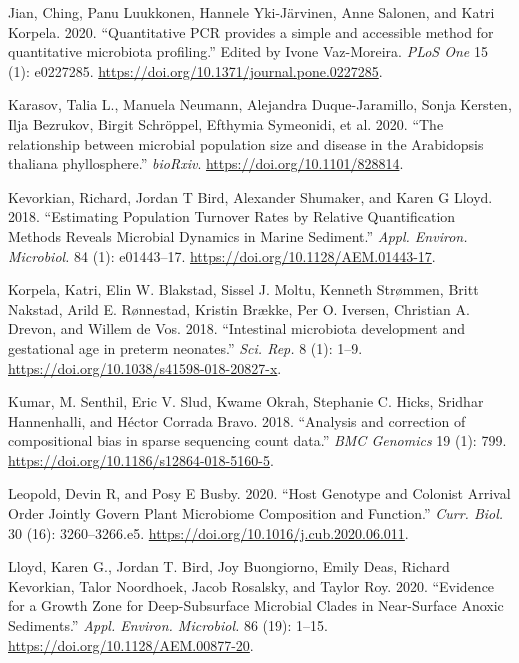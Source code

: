 \documentclass[
]{article}
\newlength{\cslhangindent}
\newlength{\cslentryspacingunit} %
\newenvironment{CSLReferences}[2] %
 {%
  \setlength{\parindent}{0pt}
  \ifodd #1
  \let\oldpar\par
  \def\par{\hangindent=\cslhangindent\oldpar}
  \fi
  \setlength{\parskip}{#2\cslentryspacingunit}
 }%
 {}
\begin{document}
\begin{CSLReferences}{1}{0}
\leavevmode{}%
Jian, Ching, Panu Luukkonen, Hannele Yki-Järvinen, Anne Salonen, and Katri Korpela. 2020. {``{Quantitative PCR provides a simple and accessible method for quantitative microbiota profiling}.''} Edited by Ivone Vaz-Moreira. \emph{PLoS One} 15 (1): e0227285. \url{https://doi.org/10.1371/journal.pone.0227285}.

\leavevmode{}%
Karasov, Talia L., Manuela Neumann, Alejandra Duque-Jaramillo, Sonja Kersten, Ilja Bezrukov, Birgit Schröppel, Efthymia Symeonidi, et al. 2020. {``{The relationship between microbial population size and disease in the Arabidopsis thaliana phyllosphere}.''} \emph{bioRxiv}. \url{https://doi.org/10.1101/828814}.

\leavevmode{}%
Kevorkian, Richard, Jordan T Bird, Alexander Shumaker, and Karen G Lloyd. 2018. {``{Estimating Population Turnover Rates by Relative Quantification Methods Reveals Microbial Dynamics in Marine Sediment}.''} \emph{Appl. Environ. Microbiol.} 84 (1): e01443--17. \url{https://doi.org/10.1128/AEM.01443-17}.

\leavevmode{}%
Korpela, Katri, Elin W. Blakstad, Sissel J. Moltu, Kenneth Strømmen, Britt Nakstad, Arild E. Rønnestad, Kristin Brække, Per O. Iversen, Christian A. Drevon, and Willem de Vos. 2018. {``{Intestinal microbiota development and gestational age in preterm neonates}.''} \emph{Sci. Rep.} 8 (1): 1--9. \url{https://doi.org/10.1038/s41598-018-20827-x}.

\leavevmode{}%
Kumar, M. Senthil, Eric V. Slud, Kwame Okrah, Stephanie C. Hicks, Sridhar Hannenhalli, and Héctor Corrada Bravo. 2018. {``{Analysis and correction of compositional bias in sparse sequencing count data}.''} \emph{BMC Genomics} 19 (1): 799. \url{https://doi.org/10.1186/s12864-018-5160-5}.

\leavevmode{}%
Leopold, Devin R, and Posy E Busby. 2020. {``{Host Genotype and Colonist Arrival Order Jointly Govern Plant Microbiome Composition and Function}.''} \emph{Curr. Biol.} 30 (16): 3260--3266.e5. \url{https://doi.org/10.1016/j.cub.2020.06.011}.

\leavevmode{}%
Lloyd, Karen G., Jordan T. Bird, Joy Buongiorno, Emily Deas, Richard Kevorkian, Talor Noordhoek, Jacob Rosalsky, and Taylor Roy. 2020. {``{Evidence for a Growth Zone for Deep-Subsurface Microbial Clades in Near-Surface Anoxic Sediments}.''} \emph{Appl. Environ. Microbiol.} 86 (19): 1--15. \url{https://doi.org/10.1128/AEM.00877-20}.


\end{CSLReferences}
\end{document}
